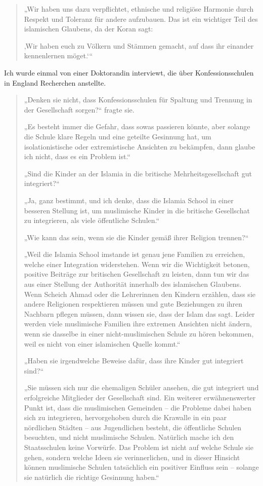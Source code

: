 \documentclass[12pt]{memoir}
\begin{document}
\begin{quote}
„Wir haben uns dazu verpflichtet, ethnische und religiöse Harmonie
durch Respekt und Toleranz für andere aufzubauen.
Das ist ein wichtiger Teil des islamischen Glaubens, da der Koran sagt:

‚Wir haben euch zu Völkern und Stämmen gemacht,
auf dass ihr einander kennenlernen möget.‘“
\end{quote}

Ich wurde einmal von einer Doktorandin interviewt,
die über Konfessionsschulen in England Recherchen anstellte.

\begin{quote}
„Denken sie nicht, dass Konfessionsschulen
für Spaltung und Trennung in der Gesellschaft sorgen?“ fragte sie.

„Es besteht immer die Gefahr, dass sowas passieren könnte,
aber solange die Schule klare Regeln und eine geteilte Gesinnung hat,
um isolationistische oder extremistische Ansichten zu bekämpfen,
dann glaube ich nicht, dass es ein Problem ist.“

„Sind die Kinder an der Islamia in die britische Mehrheitsgesellschaft
gut integriert?“

„Ja, ganz bestimmt, und ich denke,
dass die Islamia School in einer besseren Stellung ist,
um muslimische Kinder in die britische Gesellschat zu integrieren,
als viele öffentliche Schulen.“

„Wie kann das sein, wenn sie die Kinder gemäß ihrer Religion trennen?“

„Weil die Islamia School imstande ist genau jene Familien zu erreichen,
welche einer Integration widerstehen.
Wenn wir die Wichtigkeit betonen,
positive Beiträge zur britischen Gesellschaft zu leisten,
dann tun wir das aus einer Stellung der Authorität
innerhalb des islamischen Glaubens.
Wenn Scheich Ahmad oder die Lehrerinnen den Kindern erzählen,
dass sie andere Religionen respektieren müssen
und gute Beziehungen zu ihren Nachbarn pflegen müssen,
dann wissen sie, dass der Islam das sagt.
Leider werden viele muslimische Familien ihre extremen Ansichten nicht ändern,
wenn sie dasselbe in einer nicht-muslimischen Schule zu hören bekommen,
weil es nicht von einer islamischen Quelle kommt.“

„Haben sie irgendwelche Beweise dafür, dass ihre Kinder gut integriert sind?“

„Sie müssen sich nur die ehemaligen Schüler ansehen,
die gut integriert und erfolgreiche Mitglieder der Gesellschaft sind.
Ein weiterer erwähnenswerter Punkt ist, dass die muslimischen Gemeinden –
die Probleme dabei haben sich zu integrieren,
hervorgehoben durch die Krawalle in ein paar nördlichen Städten –
aus Jugendlichen besteht, die öffentliche Schulen besuchten,
und nicht muslimische Schulen.
Natürlich mache ich den Staatsschulen keine Vorwürfe.
Das Problem ist nicht auf welche Schule sie gehen,
sondern welche Ideen sie verinnerlichen,
und in dieser Hinsicht können muslimische Schulen
tatsächlich ein positiver Einfluss sein –
solange sie natürlich die richtige Gesinnung haben.“
\end{quote}
\end{document}
